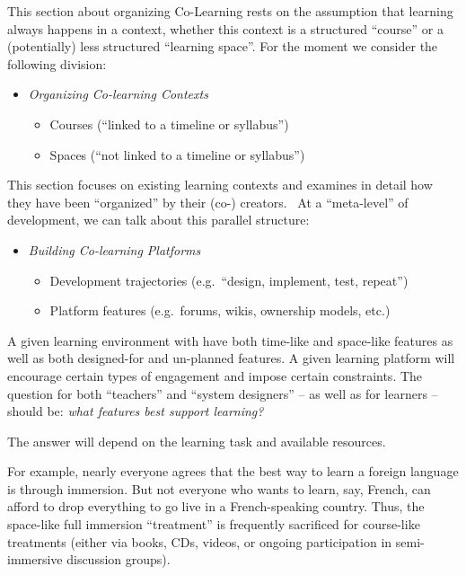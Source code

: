 This section about organizing Co-Learning rests on the assumption that
learning always happens in a context, whether this context is a
structured ``course'' or a (potentially) less structured ``learning
space''. For the moment we consider the following division:

\begin{itemize}
\itemsep1pt\parskip0pt
\item
  \emph{Organizing Co-learning Contexts}

  \begin{itemize}
  \itemsep1pt\parskip0pt
  \item
    Courses (``linked to a timeline or syllabus'')
  \item
    Spaces (``not linked to a timeline or syllabus'')
  \end{itemize}
\end{itemize}

This section focuses on existing learning contexts and examines in
detail how they have been ``organized'' by their \mbox{(co-)} \mbox{creators}.~ At a
``meta-level'' of development, we can talk about this parallel structure:

\begin{itemize}
\itemsep1pt\parskip0pt
\item
  \emph{Building Co-learning Platforms}

  \begin{itemize}
  \itemsep1pt\parskip0pt
  \item
    Development trajectories (e.g.~``design, implement, test, repeat'')
  \item
    Platform features (e.g.~forums, wikis, ownership models, etc.)
  \end{itemize}
\end{itemize}

A given learning environment with have both time-like and space-like
features as well as both designed-for and un-planned features. A given
learning platform will encourage certain types of engagement and impose
certain constraints. The question for both ``teachers'' and ``system
designers'' -- as well as for learners -- should be: \emph{what features
best support learning?}

The answer will depend on the learning task and available resources.

For example, nearly everyone agrees that the best way to learn a foreign
language is through immersion. But not everyone who wants to learn, say,
French, can afford to drop everything to go live in a French-speaking
country. Thus, the space-like full immersion ``treatment'' is frequently
sacrificed for course-like treatments (either via books, CDs, videos, or
ongoing participation in semi-immersive discussion groups).

